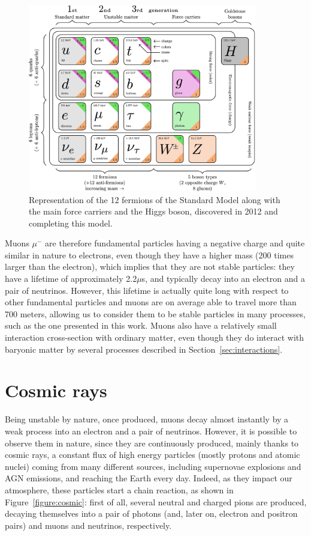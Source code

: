 \documentclass[a4paper, 11pt, twoside, openright]{report}
\begin{document}
\begin{figure}[htbp]
\begin{center}
\includegraphics[width=10cm, height=8.2cm]{figs/SMFermions.png}
\caption{Representation of the 12 fermions of the Standard Model \cite{SMFermions} along with the main force carriers and the Higgs boson, discovered in 2012 and completing this model.}
\label{figure:SMFermions}
\end{center}
\end{figure}

Muons $\mu^{-}$ are therefore fundamental particles having a negative charge and quite similar in nature to electrons, even though they have a higher mass (200 times larger than the electron), which implies that they are not stable particles: they have a lifetime of approximately 2.2$\mu$s, and typically decay into an electron and a pair of neutrinos. However, this lifetime is actually quite long with respect to other fundamental particles and muons are on average able to travel more than 700 meters, allowing us to consider them to be stable particles in many processes, such as the one presented in this work. Muons also have a relatively small interaction cross-section with ordinary matter, even though they do interact with baryonic matter by several processes described in Section~\ref{sec:interactions}.

\section{Cosmic rays} \label{sec:cosmicRays}

Being unstable by nature, once produced, muons decay almost instantly by a weak process into an electron and a pair of neutrinos. However, it is possible to observe them in nature, since they are continuously produced, mainly thanks to cosmic rays, a constant flux of high energy particles (mostly protons and atomic nuclei) coming from many different sources, including supernovae explosions and AGN emissions, and reaching the Earth every day. Indeed, as they impact our atmosphere, these particles start a chain reaction, as shown in Figure~\ref{figure:cosmic}: first of all, several neutral and charged pions are produced, decaying themselves into a pair of photons (and, later on, electron and positron pairs) and muons and neutrinos, respectively.
\end{document}
